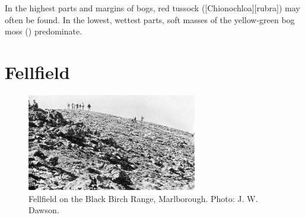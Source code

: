 In the highest parts and margins of bogs, red tussock ([Chionochloa][rubra]) may often be found.
In the lowest, wettest parts, soft masses of the yellow-green bog moss () predominate.

\section{Fellfield}

\begin{figure}
	\includegraphics[width=0.66\textwidth]{graphics/figure105fellfield.jpg}
	\centering
	\caption[Fellfield on the Black Birch Range]{Fellfield on the Black Birch Range, Marlborough.
	Photo: J. W. Dawson.}%
	\label{fig:105fellfield}
\end{figure}

